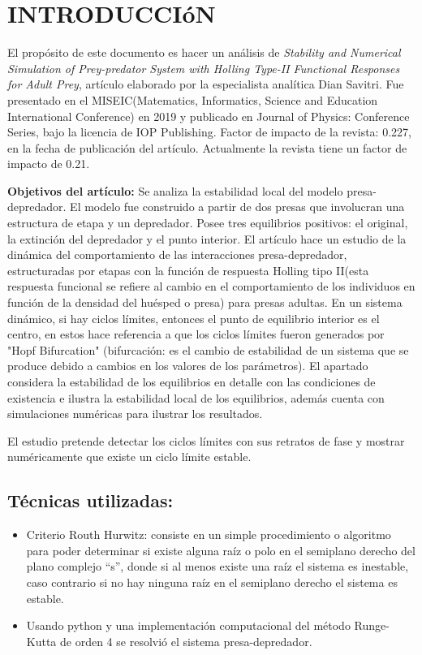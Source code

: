 \documentclass{wscpaperproc}
\theoremstyle{wsc}
\begin{document}
\section{INTRODUCCIóN}
\label{sec:intro}
El propósito de este documento es hacer un análisis de {\it Stability and Numerical Simulation of Prey-predator System with Holling
		Type-II Functional Responses for Adult Prey}, artículo elaborado por la especialista analítica Dian Savitri. Fue presentado en el MISEIC(Matematics,
Informatics, Science and Education International Conference) en 2019 y publicado en Journal of Physics: Conference Series, bajo la licencia de IOP Publishing.
Factor de impacto de la revista: 0.227, en la fecha de publicación del artículo. Actualmente la revista tiene un factor de impacto de 0.21.


	{\bf Objetivos del artículo:} Se analiza la estabilidad local del modelo presa-depredador. El modelo fue construido a partir de dos presas que involucran
una estructura de etapa y un depredador. Posee tres equilibrios positivos: el original, la extinción del depredador y el punto interior. El artículo hace un estudio de la dinámica
del comportamiento de las interacciones presa-depredador, estructuradas por etapas con la función de respuesta Holling tipo II(esta respuesta funcional se
refiere al cambio en el comportamiento de los individuos en función de la densidad del huésped o presa) para presas adultas. En un sistema dinámico,
si hay ciclos límites, entonces el punto de equilibrio interior es el centro, en estos hace referencia a que los ciclos límites fueron generados por "Hopf Bifurcation"
(bifurcación: es el cambio de estabilidad de un sistema que se produce debido a cambios en los valores de los parámetros). El apartado considera la estabilidad de
los equilibrios en detalle con las condiciones de existencia e ilustra la estabilidad local de los equilibrios, además cuenta con simulaciones numéricas para ilustrar
los resultados.

El estudio pretende detectar los ciclos límites con sus retratos de fase y mostrar numéricamente que existe un ciclo límite estable.

\subsection*{Técnicas utilizadas:}
\begin{itemize}
	\item Criterio Routh Hurwitz: consiste en un simple procedimiento o algoritmo para poder determinar si existe alguna raíz o polo en el semiplano derecho del
	      plano complejo “s”, donde si al menos existe una raíz el sistema es inestable, caso contrario si no hay ninguna raíz en el semiplano derecho el sistema es estable.
	\item Usando python y una implementación computacional del método Runge-Kutta de orden 4 se resolvió el sistema presa-depredador.
\end{itemize}
\end{document}
